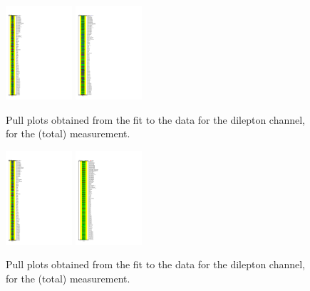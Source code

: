 \begin{figure}[ht]
  \centering
  \includegraphics[width=0.22\textwidth]{figures/diff_xsec/dilep_tty_total_mu_blinded/compare_NP_pulls/compare_NP_dilep_fits_pt_ptj1_ptll/NuisPar_comp.pdf}
  \quad \quad
  \includegraphics[width=0.22\textwidth]{figures/diff_xsec/dilep_tty_total_mu_blinded/compare_NP_pulls/compare_NP_dilep_fits_dr_dr1_dr2/NuisPar_comp.pdf}
  \caption{Pull plots obtained from the fit to the data for the dilepton channel, for the \tty (total) measurement.}
  \label{fig:pull_plot_pt_dilep_mu_blinded_1_tty_total}
\end{figure}
\FloatBarrier

\begin{figure}[ht]
  \centering
  \includegraphics[width=0.22\textwidth]{figures/diff_xsec/dilep_tty_total_mu_blinded/compare_NP_pulls/compare_NP_dilep_fits_detall_dphill_eta/NuisPar_comp.pdf}
  \quad \quad
  \includegraphics[width=0.22\textwidth]{figures/diff_xsec/dilep_tty_total_mu_blinded/compare_NP_pulls/compare_NP_dilep_fits_drphb_drlj/NuisPar_comp.pdf}
  \caption{Pull plots obtained from the fit to the data for the dilepton channel, for the \tty (total) measurement.}
  \label{fig:pull_plot_pt_dilep_mu_blinded_2_tty_total}
\end{figure}
\FloatBarrier


